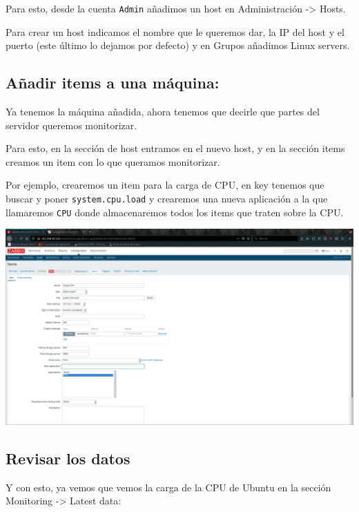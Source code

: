 \documentclass[12pt, spanish]{article}
\begin{document}
Para esto, desde la cuenta \texttt{Admin} añadimos un host en Administración -> Hosts.

Para crear un host indicamos el nombre que le queremos dar, la IP del host y el puerto (este último lo dejamos por defecto) y en Grupos añadimos Linux servers.


\subsection{Añadir items a una máquina:}

Ya tenemos la máquina añadida, ahora tenemos que decirle que partes del servidor queremos monitorizar.

Para esto, en la sección de host entramos en el nuevo host,  y en la sección items creamos un item con lo que queramos monitorizar.

Por ejemplo, crearemos un item para la carga de CPU, en key tenemos que buscar y poner \texttt{system.cpu.load} y crearemos una nueva aplicación a la que llamaremos \texttt{CPU} donde almacenaremos todos los items que traten sobre la CPU.

\begin{center}
\includegraphics[scale=0.25]{item_zabbix.png}
\end{center}

\subsection{Revisar los datos}

Y con esto, ya vemos que vemos la carga de la CPU de Ubuntu en la sección Monitoring -> Latest data:
\end{document}
